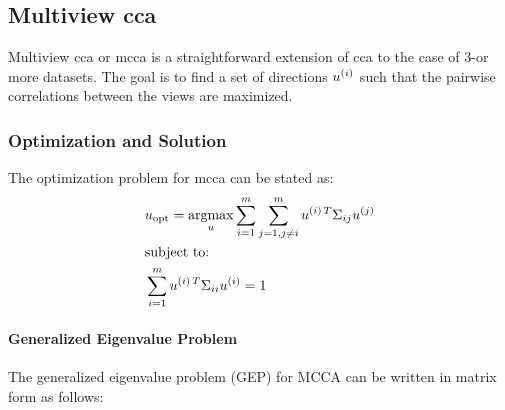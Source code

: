 \subsection{Multiview \acrshort{cca}}

Multiview \acrshort{cca} or \acrshort{mcca} is a straightforward extension of \acrshort{cca} to the case of 3-or more datasets.
The goal is to find a set of directions \(u^{(i)}\) such that the pairwise correlations between the views are maximized.

\subsubsection{Optimization and Solution}

The optimization problem for \acrshort{mcca} can be stated as:
\begin{align}
    & u_{\text{opt}} = \underset{u}{\mathrm{argmax}} \sum_{i=1}^{m} \sum_{j=1, j \neq i}^{m} u^{(i)\,T} \Sigma_{ij} u^{(j)} \\
    & \text{subject to:} \notag                                                                                               \\
    & \sum_{i=1}^{m} u^{(i)\,T} \Sigma_{ii} u^{(i)} = 1 \notag
\end{align}

\paragraph{Generalized Eigenvalue Problem}

The generalized eigenvalue problem (GEP) for MCCA can be written in matrix form as follows:

